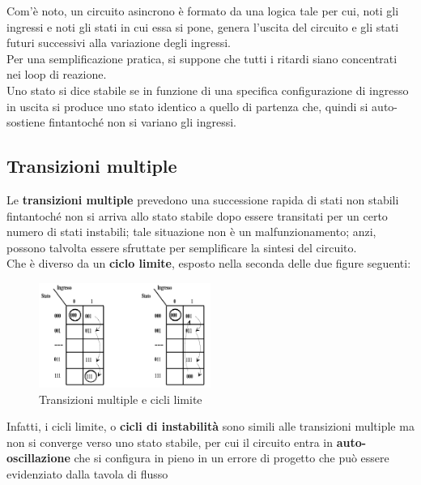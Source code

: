 \documentclass[a4paper]{extarticle}
\begin{document}
\vspace{1em}
\noindent
Com'è noto, un circuito asincrono è formato da una logica tale per cui, noti gli ingressi e noti gli stati in cui essa si pone, genera l'uscita del circuito e gli stati futuri successivi alla variazione degli ingressi.\\
Per una semplificazione pratica, si suppone che tutti i ritardi siano concentrati nei loop di reazione.\\
Uno stato si dice stabile se in funzione di una specifica configurazione di ingresso in uscita si produce uno stato identico a quello di partenza che, quindi si auto-sostiene fintantoché non si variano gli ingressi.

\vspace{1em}
\subsection{Transizioni multiple}
Le \textbf{transizioni multiple} prevedono una successione rapida di stati non stabili fintantoché non si arriva allo stato stabile dopo essere transitati per un certo numero di stati instabili; tale situazione non è un malfunzionamento; anzi, possono talvolta essere sfruttate per semplificare la sintesi del circuito.\\
Che è diverso da un \textbf{ciclo limite}, esposto nella seconda delle due figure seguenti:

\begin{figure}[H]
    \centering
    \includegraphics[width=0.50\textwidth]{transizioni-multiple.png}
    \caption{Transizioni multiple e cicli limite}
    \label{fig:transizioni-multiple}
\end{figure}

\vspace{1em}
\noindent
Infatti, i cicli limite, o \textbf{cicli di instabilità} sono simili alle transizioni multiple ma non si converge verso uno stato stabile, per cui il circuito entra in \textbf{auto-oscillazione} che si configura in pieno in un errore di progetto che può essere evidenziato dalla tavola di flusso
\end{document}
